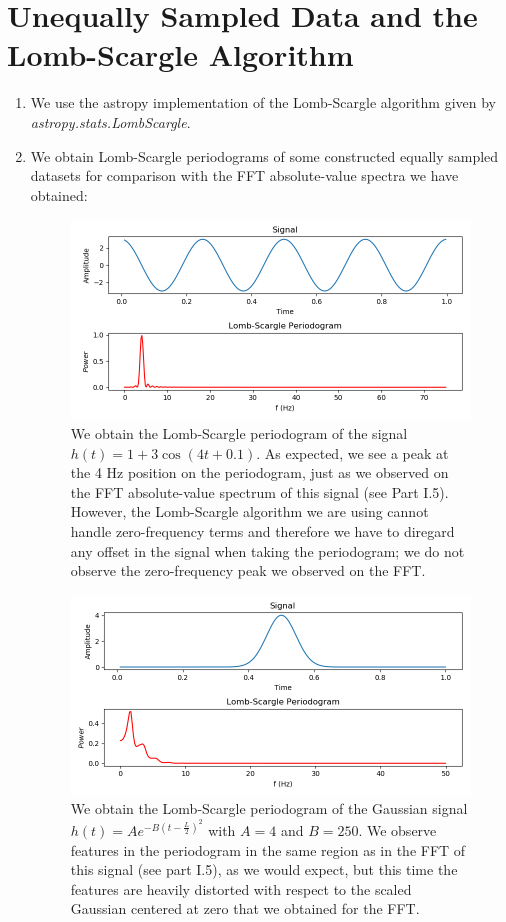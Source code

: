 \documentclass[11pt]{article}
\begin{document}
\section{Unequally Sampled Data and the Lomb-Scargle Algorithm}
\begin{enumerate}
	\item We use the astropy implementation of the Lomb-Scargle algorithm given by \textit{astropy.stats.LombScargle}.
	
	\item We obtain Lomb-Scargle periodograms of some constructed equally sampled datasets for comparison with the FFT absolute-value spectra we have obtained:
	\begin{figure}[!htp]
	\centering
	\includegraphics[scale=0.70]{sine_lombscargle.png}
	\caption{We obtain the Lomb-Scargle periodogram of the signal $h(t)=1 + 3 \cos (4t+0.1)$. As expected, we see a peak at the 4 Hz position on the periodogram, just as we observed on the FFT absolute-value spectrum of this signal (see Part I.5). However, the Lomb-Scargle algorithm we are using cannot handle zero-frequency terms and therefore we have to diregard any offset in the signal when taking the periodogram; we do not observe the zero-frequency peak we observed on the FFT.}
	\label{ls_sine}
	\end{figure}
	
	\begin{figure}[!htp]
	\centering
	\includegraphics[scale=0.70]{gaussian_lombscargle.png}
	\caption{We obtain the Lomb-Scargle periodogram of the Gaussian signal $h(t) = A e^{-B(t-\frac{L}{2})^2}$ with $A=4$ and $B=250$. We observe features in the periodogram in the same region as in the FFT of this signal (see part I.5), as we would expect, but this time the features are heavily distorted with respect to the scaled Gaussian centered at zero that we obtained for the FFT.}
	\label{ls_gaussian}
	\end{figure}
	\newpage
	

\end{enumerate}
\end{document}
